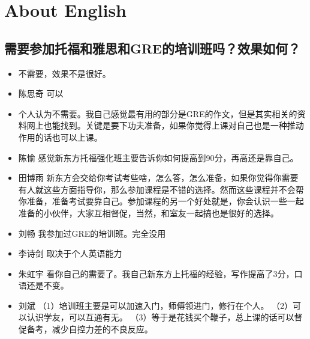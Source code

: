 \documentclass{vivid_layout}
\begin{document}
\section{About English}
\addtocounter{section}{1}
\setcounter{subsection}{0}

\subsection{需要参加托福和雅思和GRE的培训班吗？效果如何？}
\begin{itemize}
\item 不需要，效果不是很好。
\item { 陈思奇} \quad 可以
\item 个人认为不需要。我自己感觉最有用的部分是GRE的作文，但是其实相关的资料网上也能找到。关键是要下功夫准备，如果你觉得上课对自己也是一种推动作用的话也可以上课。
\item  { 陈愉}  \quad 感觉新东方托福强化班主要告诉你如何提高到90分，再高还是靠自己。
\item  { 田博雨}  \quad 新东方会交给你考试考些啥，怎么答，怎么准备，如果你觉得你需要有人就这些方面指导你，那么参加课程是不错的选择。然而这些课程并不会帮你准备，准备考试要靠自己。参加课程的另一个好处就是，你会认识一些一起准备的小伙伴，大家互相督促，当然，和室友一起搞也是很好的选择。
\item  { 刘畅}  \quad 我参加过GRE的培训班。完全没用
\item  { 李诗剑}  \quad 取决于个人英语能力
\item  { 朱虹宇}  \quad 看你自己的需要了。我自己新东方上托福的经验，写作提高了3分，口语还是不变。
\item  { 刘斌}  \quad （1）培训班主要是可以加速入门，师傅领进门，修行在个人。
  （2）可以认识学友，可以互通有无。
    （3）等于是花钱买个鞭子，总上课的话可以督促备考，减少自控力差的不良反应。
\end{itemize}
\end{document}
